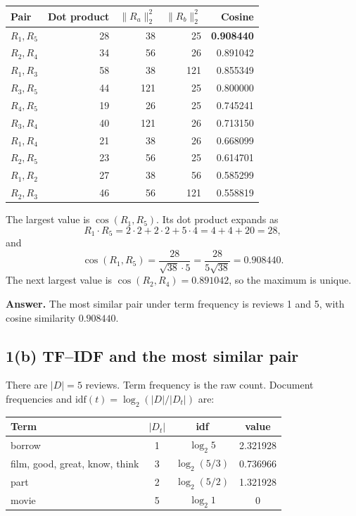 \documentclass[11pt]{article}
\begin{document}
\begin{center}
\small
\begin{tabular}{lrrrr}
\toprule
Pair & Dot product & $\|R_a\|_2^2$ & $\|R_b\|_2^2$ & Cosine \\
\midrule
$R_1,R_5$ & 28 & 38 & 25 & \textbf{0.908440} \\
$R_2,R_4$ & 34 & 56 & 26 & 0.891042 \\
$R_1,R_3$ & 58 & 38 & 121 & 0.855349 \\
$R_3,R_5$ & 44 & 121 & 25 & 0.800000 \\
$R_4,R_5$ & 19 & 26 & 25 & 0.745241 \\
$R_3,R_4$ & 40 & 121 & 26 & 0.713150 \\
$R_1,R_4$ & 21 & 38 & 26 & 0.668099 \\
$R_2,R_5$ & 23 & 56 & 25 & 0.614701 \\
$R_1,R_2$ & 27 & 38 & 56 & 0.585299 \\
$R_2,R_3$ & 46 & 56 & 121 & 0.558819 \\
\bottomrule
\end{tabular}
\end{center}

The largest value is $\cos(R_1,R_5)$. Its dot product expands as
\[
R_1\cdot R_5 = 2\cdot 2 + 2\cdot 2 + 5\cdot 4 = 4+4+20 = 28,
\]
and
\[
\cos(R_1,R_5)=\frac{28}{\sqrt{38}\cdot 5}=\frac{28}{5\sqrt{38}}=0.908440.
\]
The next largest value is $\cos(R_2,R_4)=0.891042$, so the maximum is unique.

\textbf{Answer.} The most similar pair under term frequency is reviews 1 and 5, with cosine similarity $0.908440$.

\subsection*{1(b) TF--IDF and the most similar pair}

There are $|D|=5$ reviews. Term frequency is the raw count. Document frequencies and
$\mathrm{idf}(t)=\log_2(|D|/|D_t|)$ are:

\begin{center}
\small
\begin{tabular}{lccc}
\toprule
Term & $|D_t|$ & idf & value \\
\midrule
borrow & 1 & $\log_2 5$ & 2.321928 \\
film, good, great, know, think & 3 & $\log_2(5/3)$ & 0.736966 \\
part & 2 & $\log_2(5/2)$ & 1.321928 \\
movie & 5 & $\log_2 1$ & 0 \\
\bottomrule
\end{tabular}
\end{center}
\end{document}
